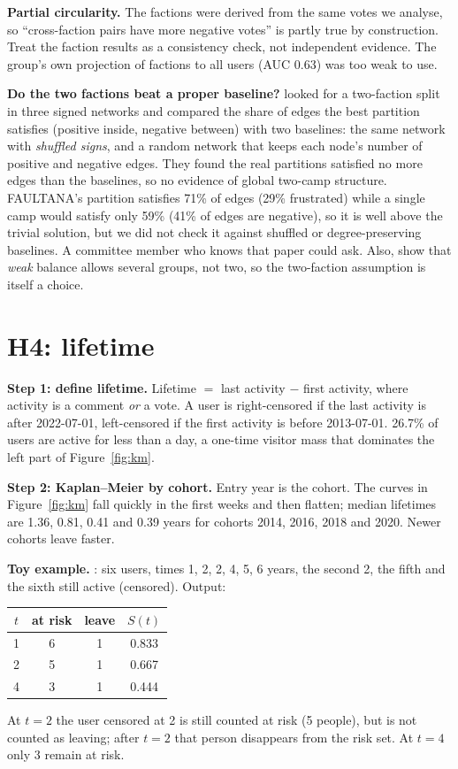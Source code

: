 \begin{pitfall}
\textbf{Partial circularity.} The factions were derived from the same votes we analyse, so ``cross-faction pairs have more negative votes'' is partly true by construction. Treat the faction results as a consistency check, not independent evidence. The group's own projection of factions to all users (AUC 0.63) was too weak to use.

\textbf{Do the two factions beat a proper baseline?}  looked for a two-faction split in three signed networks and compared the share of edges the best partition satisfies (positive inside, negative between) with two baselines: the same network with \emph{shuffled signs}, and a random network that keeps each node's number of positive and negative edges. They found the real partitions satisfied no more edges than the baselines, so no evidence of global two-camp structure. FAULTANA's partition satisfies 71\% of edges (29\% frustrated) while a single camp would satisfy only 59\% (41\% of edges are negative), so it is well above the trivial solution, but we did not check it against shuffled or degree-preserving baselines. A committee member who knows that paper could ask. Also,  show that \emph{weak} balance allows several groups, not two, so the two-faction assumption is itself a choice.
\end{pitfall}

\section{H4: lifetime}\label{sec:h4}

\textbf{Step 1: define lifetime.} Lifetime $=$ last activity $-$ first activity, where activity is a comment \emph{or} a vote. A user is right-censored if the last activity is after 2022-07-01, left-censored if the first activity is before 2013-07-01. 26.7\% of users are active for less than a day, a one-time visitor mass that dominates the left part of Figure~\ref{fig:km}.

\textbf{Step 2: Kaplan--Meier by cohort.} Entry year is the cohort. The curves in Figure~\ref{fig:km} fall quickly in the first weeks and then flatten; median lifetimes are 1.36, 0.81, 0.41 and 0.39 years for cohorts 2014, 2016, 2018 and 2020. Newer cohorts leave faster.

\textbf{Toy example.} : six users, times 1, 2, 2, 4, 5, 6 years, the second 2, the fifth and the sixth still active (censored). Output:
\begin{center}
\begin{tabular}{@{}cccc@{}}
\toprule
$t$ & at risk & leave & $S(t)$ \\
\midrule
1 & 6 & 1 & 0.833 \\
2 & 5 & 1 & 0.667 \\
4 & 3 & 1 & 0.444 \\
\bottomrule
\end{tabular}
\end{center}
At $t=2$ the user censored at 2 is still counted at risk (5 people), but is not counted as leaving; after $t=2$ that person disappears from the risk set. At $t=4$ only 3 remain at risk.


